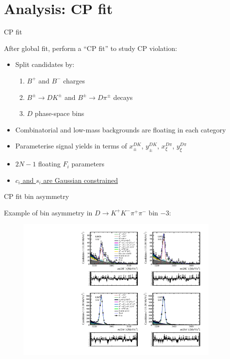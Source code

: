 \documentclass[xcolor={dvipsnames}]{beamer}
\begin{document}
\section{Analysis: CP fit}
\begin{frame}{CP fit}
  \begin{center}
    {\large After global fit, perform a ``CP fit'' to study CP violation:}
  \end{center}
  \begin{itemize}
    \setlength\itemsep{1.0em}
    \item{Split candidates by:}
    \begin{enumerate}
      \item{$B^+$ and $B^-$ charges}
      \item{$B^\pm\to DK^\pm$ and $B^\pm\to D\pi^\pm$ decays}
      \item{$D$ phase-space bins}
    \end{enumerate}
    \item{Combinatorial and low-mass backgrounds are floating in each category}
    \item{Parameterise signal yields in terms of $x_\pm^{DK}$, $y_\pm^{DK}$, $x_\xi^{D\pi}$, $y_\xi^{D\pi}$}
    \item{$2N - 1$ floating $F_i$ parameters}
    \item{\underline{$c_i$ and $s_i$ are Gaussian constrained}}
  \end{itemize}
\end{frame}

\begin{frame}{CP fit bin asymmetry}
  \begin{center}
    {\large Example of bin asymmetry in $D\to K^+K^-\pi^+\pi^-$ bin $-3$:}
  \end{center}
  \begin{figure}
    \centering
    \includegraphics[width = 0.9\textwidth,trim={0 10cm 0 0},clip=true]{Plots/d2kkpipi_fiveL_binm3.pdf}
  \end{figure}
\end{frame}
\end{document}
